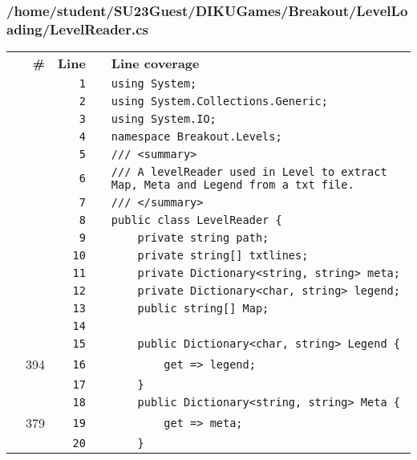 \documentclass[a4paper,landscape,10pt]{article}
\begin{document}
\subsubsection{/home/student/SU23Guest/DIKUGames/Breakout/LevelLoading/LevelReader.cs}
\begin{longtable}[l]{lrrll}
\textbf{} & \textbf{\#} & \textbf{Line} & \textbf{} & \textbf{Line coverage}\\
\cellcolor{gray} &  & \verb~1~ & & \verb~using System;~\\
\cellcolor{gray} &  & \verb~2~ & & \verb~using System.Collections.Generic;~\\
\cellcolor{gray} &  & \verb~3~ & & \verb~using System.IO;~\\
\cellcolor{gray} &  & \verb~4~ & & \verb~namespace Breakout.Levels;~\\
\cellcolor{gray} &  & \verb~5~ & & \verb~/// <summary>~\\
\cellcolor{gray} &  & \verb~6~ & & \verb~/// A levelReader used in Level to extract Map, Meta and Legend from a txt file.~\\
\cellcolor{gray} &  & \verb~7~ & & \verb~/// </summary>~\\
\cellcolor{gray} &  & \verb~8~ & & \verb~public class LevelReader {~\\
\cellcolor{gray} &  & \verb~9~ & & \verb~    private string path;~\\
\cellcolor{gray} &  & \verb~10~ & & \verb~    private string[] txtlines;~\\
\cellcolor{gray} &  & \verb~11~ & & \verb~    private Dictionary<string, string> meta;~\\
\cellcolor{gray} &  & \verb~12~ & & \verb~    private Dictionary<char, string> legend;~\\
\cellcolor{gray} &  & \verb~13~ & & \verb~    public string[] Map;~\\
\cellcolor{gray} &  & \verb~14~ & & \verb~~\\
\cellcolor{gray} &  & \verb~15~ & & \verb~    public Dictionary<char, string> Legend {~\\
\cellcolor{green} & 394 & \verb~16~ & & \verb~        get => legend;~\\
\cellcolor{gray} &  & \verb~17~ & & \verb~    }~\\
\cellcolor{gray} &  & \verb~18~ & & \verb~    public Dictionary<string, string> Meta {~\\
\cellcolor{green} & 379 & \verb~19~ & & \verb~        get => meta;~\\
\cellcolor{gray} &  & \verb~20~ & & \verb~    }~\\

\end{longtable}
\end{document}
